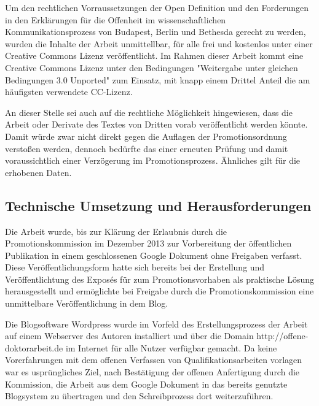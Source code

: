 Um den rechtlichen Vorraussetzungen der Open Definition und den Forderungen in den Erklärungen für die Offenheit im wissenschaftlichen Kommunikationsprozess von Budapest, Berlin und Bethesda gerecht zu werden, wurden die Inhalte der Arbeit unmittellbar, für alle frei und kostenlos unter einer Creative Commons Lizenz veröffentlicht. Im Rahmen dieser Arbeit kommt eine Creative Commons Lizenz unter den Bedingungen "Weitergabe unter gleichen Bedingungen 3.0 Unported" zum Einsatz, mit knapp einem Drittel Anteil die am häufigsten verwendete CC-Lizenz.

An dieser Stelle sei auch auf die rechtliche Möglichkeit hingewiesen, dass die Arbeit oder Derivate des Textes von Dritten vorab veröffentlicht werden könnte. Damit würde zwar nicht direkt gegen die Auflagen der Promotionsordnung verstoßen werden, dennoch bedürfte das einer erneuten Prüfung und damit voraussichtlich einer Verzögerung im Promotionsprozess. Ähnliches gilt für die erhobenen Daten.

\subsection{Technische Umsetzung und Herausforderungen}

Die Arbeit wurde, bis zur Klärung der Erlaubnis durch die Promotionskommission im Dezember 2013 zur Vorbereitung der öffentlichen Publikation in einem geschlossenen Google Dokument ohne Freigaben verfasst. Diese Veröffentlichungsform hatte sich bereits bei der Erstellung und Veröffentlichtung des Exposés für zum Promotionsvorhaben \cite{heise_2012_expose} als praktische Lösung herausgestellt und ermöglichte bei Freigabe durch die Promotionskommission eine unmittelbare Veröffentlichung in dem Blog.

Die Blogsoftware Wordpress wurde im Vorfeld des Erstellungsprozess der Arbeit auf einem Webserver des Autoren installiert und über die Domain http://offene-doktorarbeit.de im Internet für alle Nutzer verfügbar gemacht. Da keine Vorerfahrungen mit dem offenen Verfassen von Qualifikationsarbeiten vorlagen war es usprüngliches Ziel, nach Bestätigung der offenen Anfertigung durch die Kommission, die Arbeit aus dem Google Dokument in das bereits genutzte Blogsystem zu übertragen und den Schreibprozess dort weiterzuführen.

